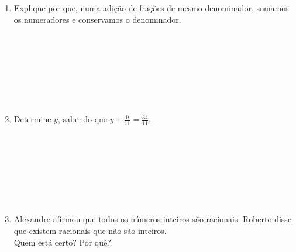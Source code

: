 \documentclass[a4paper,14pt]{article}
\begin{document}
\begin{multicols}{2}
\begin{enumerate}
\begin{enumerate}[a)]
			\end{enumerate}
			\item Explique por que, numa adição de frações de mesmo denominador, somamos os numeradores e conservamos o denominador. \\\\\\\\\\\\\\\\
			\item Determine $y$, sabendo que $y + \frac{9}{11} = \frac{34}{11}$. \\\\\\\\\\\\\\\\
			\item Alexandre afirmou que todos os números inteiros são racionais. Roberto disse que existem racionais que não são inteiros. \\
			Quem está certo? Por quê?
		\end{enumerate}

\end{multicols}
\end{document}
